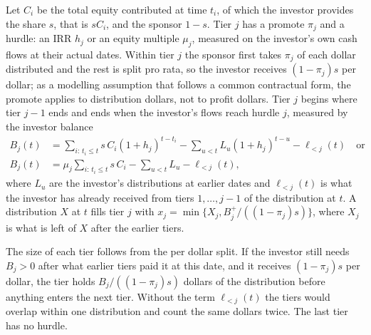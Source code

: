 \begin{chapterrefs}
\begin{definition}\label{def2:promote}
Let $C_i$ be the total equity contributed at time $t_i$, of which the investor provides the share $s$,
that is $sC_i$, and the sponsor $1-s$. Tier $j$ has a promote
$\pi_j$ and a hurdle: an IRR $h_j$ or an equity multiple $\mu_j$, measured on the investor's own cash
flows at their actual dates. Within tier $j$ the sponsor first takes $\pi_j$ of each dollar
distributed and the rest is split pro rata, so the investor receives $(1-\pi_j)s$ per dollar; as a
modelling assumption that follows a common contractual form, the promote applies to distribution
dollars, not to profit dollars. Tier $j$ begins where tier $j-1$ ends
and ends when the investor's flows reach hurdle $j$, measured by the investor balance
\begin{equation}\label{eq2:tierbalance}
\begin{aligned}
  B_j(t) &= \sum_{i:\,t_i\le t} s\,C_i (1+h_j)^{t-t_i} - \sum_{u<t} L_u (1+h_j)^{t-u} - \ell_{<j}(t)
  \quad\text{or}\\
  B_j(t) &= \mu_j \sum_{i:\,t_i\le t} s\,C_i - \sum_{u<t} L_u - \ell_{<j}(t),
\end{aligned}
\end{equation}
where $L_u$ are the investor's distributions at earlier dates and $\ell_{<j}(t)$ is what the investor has
already received from tiers $1,\dots,j-1$ of the distribution at $t$. A distribution $X$ at $t$ fills
tier $j$ with $x_j = \min\{X_j, B_j^{+}/((1-\pi_j)s)\}$, where $X_j$ is what is left of $X$ after the
earlier tiers.
\end{definition}

The size of each tier follows from the per dollar split. If the investor still needs $B_j>0$ after
what earlier tiers paid it at this date, and it receives $(1-\pi_j)s$ per dollar, the tier holds
$B_j/((1-\pi_j)s)$ dollars of the distribution before anything enters the next tier. Without the term
$\ell_{<j}(t)$ the tiers would overlap within one distribution and count the same dollars twice. The
last tier has no hurdle.


\end{chapterrefs}
